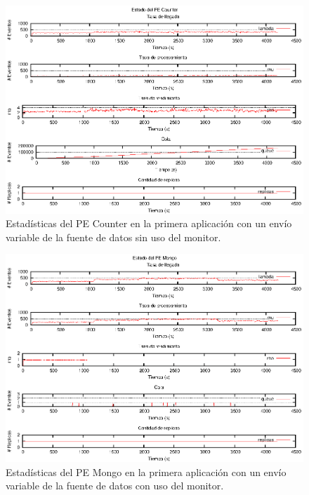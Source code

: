 \begin{figure}[p]
\centering
    \includegraphics[scale=1.1]{images/exp/app1/normal/sm/statusCounterPE.eps}
    \caption{Estadísticas del PE Counter en la primera aplicación con un envío variable de la fuente de datos sin uso del monitor.}
    \label{fig:app1-normal-statusCounterPE-sm}
\end{figure}

\begin{figure}[p]
\centering
    \includegraphics[scale=1.1]{images/exp/app1/normal/cm/statusMongoPE.eps}
    \caption{Estadísticas del PE Mongo en la primera aplicación con un envío variable de la fuente de datos con uso del monitor.}
    \label{fig:app1-normal-statusMongoPE-cm}
\end{figure}

